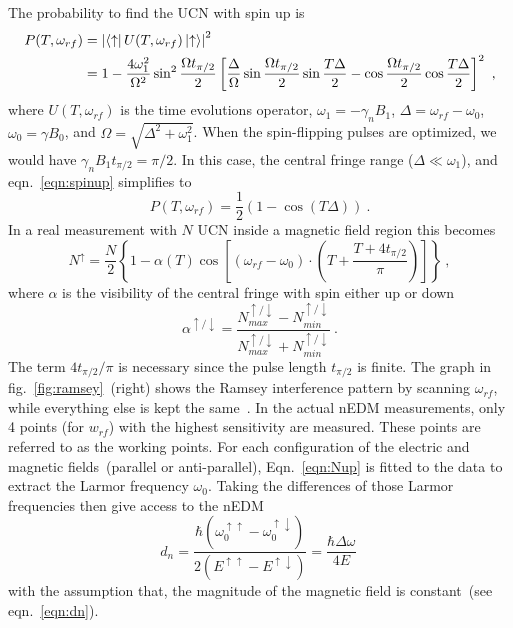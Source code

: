 The probability to find the UCN with spin up is
\begin{align}
  \label{eqn:spinup}
  P(T, \omega_{rf}) &= \left| \bra{\uparrow} U(T, \omega_{rf}) \ket{\uparrow}\right|^2 \\ \nonumber
  &= 1 - \frac{4 \omega_1^2}{\Omega^2} \sin ^2 \frac{\Omega t_{\pi/2}}{2} \left[ \frac{\Delta}{\Omega} \sin  \frac{\Omega t_{\pi/2}}{2} \sin \frac{T\Delta}{2} - \cos  \frac{\Omega t_{\pi/2}}{2} \cos\frac{T\Delta}{2} \right]^2~,
\end{align}
where $U(T, \omega_{rf})$ is the time evolutions operator,
$\omega_1 = - \gamma_n B_1$, $\Delta = \omega_{rf} - \omega_0$,
$\omega_0 = \gamma B_0$, and $\Omega = \sqrt{\Delta^2 +
  \omega_1^2}$. When the spin-flipping pulses are optimized, we would
have $\gamma_n B_1 t_{\pi/2} = \pi / 2$. In this case, the central
fringe range ($\Delta \ll \omega_1$), and eqn.~\ref{eqn:spinup}
simplifies to
\begin{equation}
  P(T, \omega_{rf}) = \frac{1}{2} \left( 1 - \cos(T\Delta) \right)~.
\end{equation}
In a real measurement with $N$ UCN inside a magnetic field region this
becomes
\begin{equation}
  \label{eqn:Nup}
  N^{\uparrow} = \frac{N}{2} \left\lbrace 1 - \alpha(T) \cos \left[ (\omega_{rf} - \omega_0 ) \cdot \left(T+\frac{T+4t_{\pi/2}}{\pi}\right)\right]\right\rbrace~,
\end{equation}
where $\alpha$ is the visibility of the central fringe with spin
either up or down
\begin{equation}
  \label{eqn:visibility}
  \alpha^{\uparrow /\downarrow} = \frac{N_{max}^{\uparrow /\downarrow} - N_{min}^{\uparrow /\downarrow}}{N_{max}^{\uparrow /\downarrow}+ N_{min}^{\uparrow /\downarrow}}~.
\end{equation}
The term $4t_{\pi/2}/\pi$ is necessary since the pulse length
$t_{\pi/2}$ is finite. The graph in fig.~\ref{fig:ramsey}~(right)
shows the Ramsey interference pattern by scanning $\omega_{rf}$, while
everything else is kept the same~\cite{Schmidt-Wellenburg:2016nfv}. In
the actual nEDM measurements, only 4 points (for $w_{rf}$) with the
highest sensitivity are measured. These points are referred to as the
working points. For each configuration of the electric and magnetic
fields~(parallel or anti-parallel), Eqn.~\ref{eqn:Nup} is fitted to
the data to extract the Larmor frequency $\omega_0$. Taking the
differences of those Larmor frequencies then give access to the nEDM
\begin{equation}
  \label{eqn:fitteddn}
  d_n = \frac{\hbar (\omega_0 ^{\uparrow \uparrow} - \omega_0 ^{\uparrow \downarrow})}{2(E^{\uparrow \uparrow} - E^{\uparrow \downarrow})} = \frac{\hbar \Delta \omega}{4E}~
\end{equation}
with the assumption that, the magnitude of the magnetic field is
constant~(see eqn.~\ref{eqn:dn}).


